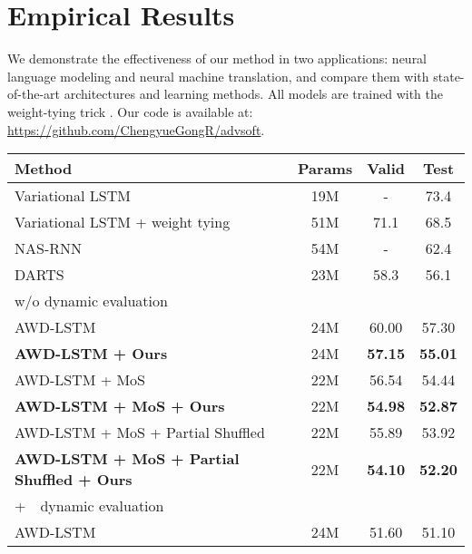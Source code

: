 \documentclass{article}
\begin{document}
%
 
\section{Empirical Results} 
\label{sec:experiement}
We demonstrate the effectiveness of our method
in two applications: neural language modeling and 
neural machine translation, and compare them with state-of-the-art architectures and learning methods.
All models are trained with the weight-tying trick \citep{press2016using, inan2016tying}. 
Our code is available at:~ \url{https://github.com/ChengyueGongR/advsoft}.



\begin{table*}[ht]
\begin{center}
    \setlength{\tabcolsep}{1.2em}
        \begin{tabular}{l|c||cc}
            \toprule
            Method & \bf Params & Valid & Test \\
            \hline
            Variational LSTM~\cite{gal2016theoretically} & 19M & - & 73.4 \\
            Variational LSTM + weight tying~\cite{inan2016tying} & 51M & 71.1 & 68.5 \\
            NAS-RNN~\cite{zoph2016neural} & 54M & - & 62.4 \\
            DARTS~\cite{liu2018darts} & 23M & 58.3 & 56.1 \\
            \hline
            \multicolumn{4}{l}{w/o dynamic evaluation} \\ 
            \hline
            AWD-LSTM ~\citep{merity2017regularizing} & 24M & 60.00 & 57.30\\
            \bf{AWD-LSTM + Ours} & 24M & \bf{57.15} & \bf{55.01}\\
AWD-LSTM + MoS \citep{yang2017breaking} & 22M & 56.54 & 54.44 \\
            \bf AWD-LSTM + MoS + Ours & 22M & \bf{54.98} & \bf{52.87} \\
            AWD-LSTM + MoS + Partial Shuffled \citep{press2019partially} & 22M & 55.89 & 53.92 \\
            \bf AWD-LSTM + MoS + Partial Shuffled + Ours & 22M & \bf{54.10} & \bf{52.20} \\
\hline
            \multicolumn{4}{l}{+~~dynamic evaluation \citep{krause2017dynamic}} \\ 
            \hline
            AWD-LSTM 
            ~\citep{merity2017regularizing}   & 24M & 51.60 & 51.10\\

\end{tabular}
\end{center}
\end{table*}
\end{document}
